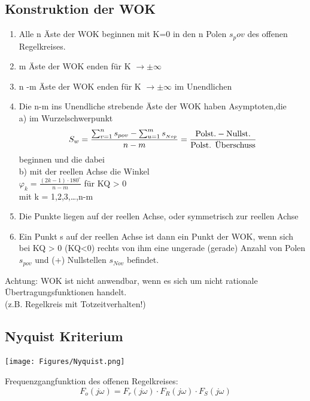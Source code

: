 \subsection{Konstruktion der WOK}
\begin{mdframed}[style=exercise]
	\begin{enumerate}[leftmargin=*]
		\item Alle n Äste der WOK beginnen mit K=0 in den n Polen $s_pov$ des offenen Regelkreises.
		\item m Äste der WOK enden für K $\rightarrow \pm \infty$
		\item n -m Äste der WOK enden für K $\rightarrow \pm \infty$ im Unendlichen
		\item Die n-m ins Unendliche strebende Äste der WOK haben Asymptoten,die\\
		      a) im Wurzelschwerpunkt
		      \[S_{w}=\frac{\sum_{v=1}^{n} s_{pov}-\sum_{u=1}^{m} s_{_{Nop}}}{n-m} 
                        = \dfrac{\textnormal{Polst.}- \textnormal{Nullst.}}{\textnormal{Polst. Überschuss}}\]
		      beginnen und die dabei\\
		      b) mit der reellen Achse die Winkel\\
		      $\varphi_{k}=\frac{(2 k-1) \cdot 180^{\circ}}{n-m}$ für KQ > 0\\
		      mit k = 1,2,3,\dots,n-m
		\item Die Punkte liegen auf der reellen Achse, oder symmetrisch zur reellen Achse
		\item Ein Punkt s auf der reellen Achse ist dann ein Punkt der WOK, wenn sich bei KQ > 0 (KQ<0)
		      rechts von ihm eine ungerade (gerade) Anzahl von Polen $s_{pov}$ und (+) Nullstellen $s_{Nov}$ befindet.
	\end{enumerate}

	Achtung: WOK ist nicht anwendbar, wenn es sich um nicht rationale
	Übertragungsfunktionen handelt.\\ (z.B. Regelkreis mit Totzeitverhalten!)
\end{mdframed}

\subsection{Nyquist Kriterium}
\begin{center}
	\texttt{[image: Figures/Nyquist.png]}
\end{center}
Frequenzgangfunktion des offenen Regelkreises:
\[
	F_o (j\omega) = F_r (j\omega) \cdot F_R (j\omega) \cdot F_S (j\omega)
\]

